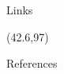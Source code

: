 \documentclass[final]{beamer}
\begin{document}
\begin{frame}{}
\begin{textblock}{40.5}
      \begin{exampleblock}{Links}
        
      \end{exampleblock}

    \end{textblock}

    \begin{textblock}{40.5}(42.6,97)

      \begin{block}{References}
        \small
      \end{block}

    \end{textblock}


  \end{frame}
\end{document}
